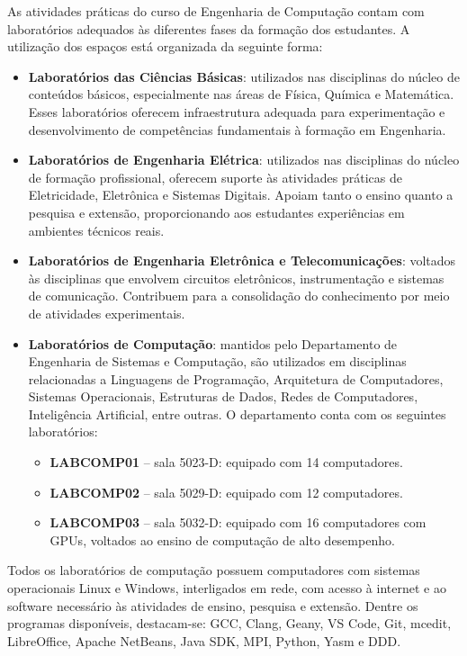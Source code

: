 As atividades práticas do curso de Engenharia de Computação contam com laboratórios adequados às diferentes fases da formação dos estudantes. A utilização dos espaços está organizada da seguinte forma:

\begin{itemize}
    \item \textbf{Laboratórios das Ciências Básicas}: utilizados nas disciplinas do núcleo de conteúdos básicos, especialmente nas áreas de Física, Química e Matemática. Esses laboratórios oferecem infraestrutura adequada para experimentação e desenvolvimento de competências fundamentais à formação em Engenharia.

    \item \textbf{Laboratórios de Engenharia Elétrica}: utilizados nas disciplinas do núcleo de formação profissional, oferecem suporte às atividades práticas de Eletricidade, Eletrônica e Sistemas Digitais. Apoiam tanto o ensino quanto a pesquisa e extensão, proporcionando aos estudantes experiências em ambientes técnicos reais.

    \item \textbf{Laboratórios de Engenharia Eletrônica e Telecomunicações}: voltados às disciplinas que envolvem circuitos eletrônicos, instrumentação e sistemas de comunicação. Contribuem para a consolidação do conhecimento por meio de atividades experimentais.

    \item \textbf{Laboratórios de Computação}: mantidos pelo Departamento de Engenharia de Sistemas e Computação, são utilizados em disciplinas relacionadas a Linguagens de Programação, Arquitetura de Computadores, Sistemas Operacionais, Estruturas de Dados, Redes de Computadores, Inteligência Artificial, entre outras. O departamento conta com os seguintes laboratórios:
          \begin{itemize}
              \item \textbf{LABCOMP01} – sala 5023-D: equipado com 14 computadores.
              \item \textbf{LABCOMP02} – sala 5029-D: equipado com 12 computadores.
              \item \textbf{LABCOMP03} – sala 5032-D: equipado com 16 computadores com GPUs, voltados ao ensino de computação de alto desempenho.
          \end{itemize}
\end{itemize}

Todos os laboratórios de computação possuem computadores com sistemas operacionais Linux e Windows, interligados em rede, com acesso à internet e ao software necessário às atividades de ensino, pesquisa e extensão. Dentre os programas disponíveis, destacam-se: GCC, Clang, Geany, VS Code, Git, mcedit, LibreOffice, Apache NetBeans, Java SDK, MPI, Python, Yasm e DDD.

